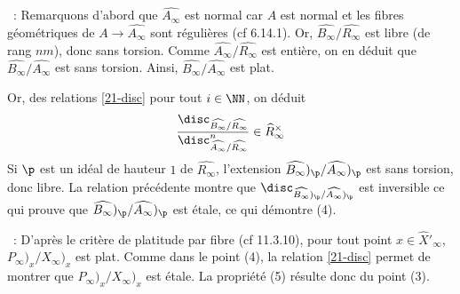 \documentclass[10pt]{../fichiers-configuration-latex/smfart}
\begin{document}
\medskip

~: 
Remarquons d'abord que 
$\widehat{A_\infty}$ est normal
car $A$ est normal et les fibres géométriques de
 $A \rightarrow  \widehat{A_\infty}$ sont régulières
(cf  {6.14.1}).
Or, $\widehat{B_\infty}/\widehat{R_\infty}$ est libre (de rang $nm$),
donc sans torsion. Comme $\widehat{A_\infty}/\widehat{R_\infty}$
est entière, on en déduit que $\widehat{B_\infty}/\widehat{A_\infty}$
est sans torsion. 
Ainsi, $\widehat{B_\infty}/\widehat{A_\infty}$ est plat.

Or, des relations \eqref{21-disc} pour tout $i \in \NN$,
on déduit
$$
\frac{\disc_{\widehat{B_\infty}/\widehat{R_\infty}}}
 {\disc_{\widehat{A_\infty}/\widehat{R_\infty}}^n} \in \widehat R_\infty^\times
$$
Si $\p$ est un idéal de hauteur $1$ de $\widehat{R_\infty}$,
l'extension $\widehat{B_\infty})_\p/\widehat{A_\infty})_\p$ est sans torsion,
donc libre. 
La relation précédente montre que
$\disc_{\widehat{B_\infty})_\p/\widehat{A_\infty})_\p}$ est inversible
ce qui prouve que $\widehat{B_\infty})_\p/\widehat{A_\infty})_\p$ est 
étale, ce qui démontre (4).

\medskip

~:
D'après le critère de platitude par fibre (cf  {11.3.10}),
pour tout point $x \in \hat X'_\infty$, $P_\infty)_x/X_\infty)_x$ est plat.
Comme dans le point (4), la relation \eqref{21-disc} permet de montrer que
$P_\infty)_x/X_\infty)_x$ est étale. La propriété (5) résulte donc du point 
(3).


\ifx\danslelivre\undefined


\end{document}
